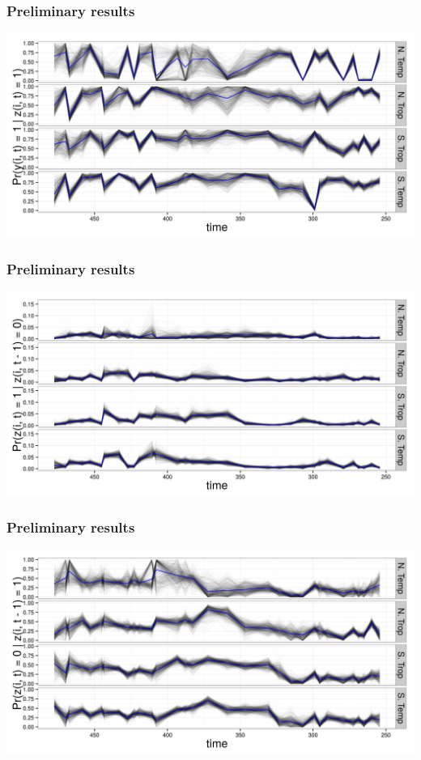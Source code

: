 \documentclass{beamer}
\begin{document}
\begin{frame}
  \frametitle{Preliminary results}
  \begin{center}
    \includegraphics[width=\textwidth,height=0.8\textheight,keepaspectratio=true]{figure/observation}
  \end{center}
\end{frame}
\begin{frame}
  \frametitle{Preliminary results}
  \begin{center}
    \includegraphics[width=\textwidth,height=0.8\textheight,keepaspectratio=true]{figure/entrance}
  \end{center}
\end{frame}


\begin{frame}
  \frametitle{Preliminary results}
  \begin{center}
    \includegraphics[width=\textwidth,height=0.8\textheight,keepaspectratio=true]{figure/extinction}
  \end{center}
\end{frame}
\end{document}

